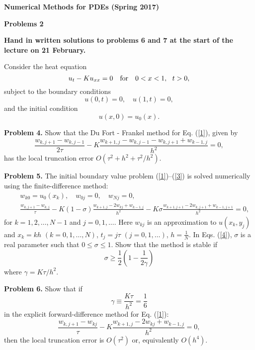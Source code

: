 \documentclass[10pt]{article}
\begin{document}
\begin{center}
{\large{\bf Numerical Methods for PDEs (Spring 2017)}}
\end{center}

\begin{center}
{\large{\bf Problems 2}}
\end{center}

\noindent
{\bf Hand in written solutions to problems 6 and 7 at the start of the lecture on 21 February.}

\noindent
Consider the heat equation
\begin{equation}
u_{t}-K u_{xx}=0 \quad \hbox{for} \quad 0<x<1, \ \ t>0, \label{1}
\end{equation}
subject to the boundary conditions
\begin{equation}
u(0,t)=0, \quad u(1, t)=0,  \label{2}
\end{equation}
and the initial condition
\begin{equation}
u(x,0)=u_{0}(x).  \label{3}
\end{equation}

\vskip 0.5cm \noindent
{\bf Problem 4.} Show that the Du Fort - Frankel method for Eq. (\ref{1}),
given by
\[
\frac{w_{k,j+1}-w_{k,j-1}}{2\tau}-K \frac{w_{k+1,
j}-w_{k,j-1}-w_{k,j+1}+w_{k-1,j}}{h^{2}}=0,
\]
has the local truncation error $O\left(\tau^2+h^2+\tau^2/h^2\right)$.

\vskip 0.5cm \noindent
{\bf Problem 5.} The initial boundary value
problem (\ref{1})--(\ref{3}) is solved numerically using the
finite-difference method:
\begin{eqnarray}
&&w_{k0}=u_{0}(x_{k}), \quad w_{0j}=0, \quad w_{Nj}=0,   \nonumber \\
&&\frac{w_{k,j+1}-w_{k,j}}{\tau}-K(1-\sigma) \frac{w_{k+1,
j}-2w_{kj}+w_{k-1,j}}{h^{2}}-K\sigma \frac{w_{k+1,
j+1}-2w_{k,j+1}+w_{k-1,j+1}}{h^{2}}=0,   \label{4}
\end{eqnarray}
for $k=1, 2, \dots , N-1$ and $j=0, 1, \dots$. Here $w_{kj}$ is an
approximation to $u(x_{k}, y_{j})$ and $x_{k}=k h$
$(k=0,1,\dots,N)$, $t_{j}=j \tau$ $(j=0,1,\dots)$, $h=\frac{1}{N}$.
In Eqs. (\ref{4}), $\sigma$ is a real parameter such that
$0\leq \sigma\leq 1$. Show that the method is stable if
\[
\sigma\geq\frac{1}{2}\left(1-\frac{1}{2\gamma}\right)
\]
where $\gamma=K\tau/h^2$.


\vskip 0.5cm
\noindent
{\bf Problem 6.} Show that if
\[
\gamma\equiv\frac{K\tau}{h^2}=\frac{1}{6}
\]
in the explicit forward-difference method for Eq. (\ref{1}):
\[
\frac{w_{k,j+1}-w_{kj}}{\tau}-K
\frac{w_{k+1, j}-2w_{kj}+w_{k-1,j}}{h^{2}}=0,
\]
then the local truncation error is $O(\tau^2)$ or, equivalently $O(h^4)$.
\end{document}
